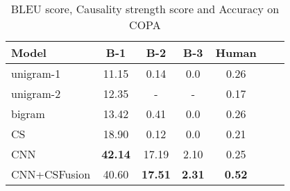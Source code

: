 \begin{table}[th]
	\centering
    \small
	\begin{tabular}{|l|c|c|c|c|c|c|}
		\hline
		Model &   B-1 & B-2 & B-3 & Human\\	\hline
        unigram-1 & 11.15 & 0.14 & 0.0 & 0.26 \\\hline
        unigram-2 & 12.35 & -  & - & 0.17 \\\hline
        bigram & 13.42 & 0.41 & 0.0 & 0.26 \\\hline
		CS & 18.90 & 0.12 & 0.0 & 0.21 \\\hline
		CNN & \bf 42.14 & 17.19 & 2.10 & 0.25 \\\hline
		CNN+CSFusion & 40.60 & \bf 17.51 & \bf 2.31 & \bf 0.52 \\\hline
	\end{tabular}
	\caption{BLEU score, Causality strength score and Accuracy on COPA}
	\label{tab:copa}
\end{table}

